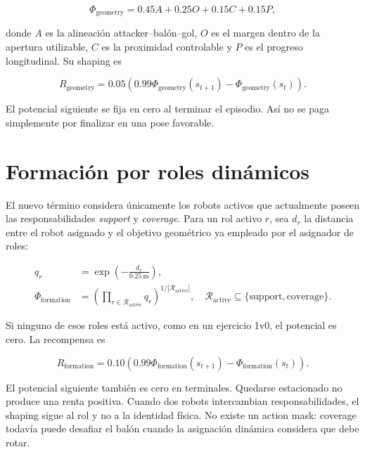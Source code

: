 \documentclass[11pt]{article}
\begin{document}
\begin{equation}
\Phi_{\mathrm{geometry}} =
0.45 A + 0.25 O + 0.15 C + 0.15 P,
\end{equation}

donde $A$ es la alineación attacker--balón--gol, $O$ es el margen dentro de la apertura
utilizable, $C$ es la proximidad controlable y $P$ es el progreso longitudinal. Su shaping es

\begin{equation}
R_{\mathrm{geometry}} = 0.05
\left(0.99\Phi_{\mathrm{geometry}}(s_{t+1})-
\Phi_{\mathrm{geometry}}(s_t)\right).
\end{equation}

El potencial siguiente se fija en cero al terminar el episodio. Así no se paga simplemente por
finalizar en una pose favorable.

\section{Formación por roles dinámicos}

El nuevo término considera únicamente los robots activos que actualmente poseen las
responsabilidades \emph{support} y \emph{coverage}. Para un rol activo $r$, sea $d_r$ la distancia
entre el robot asignado y el objetivo geométrico ya empleado por el asignador de roles:

\begin{align}
q_r &= \exp\!\left(-\frac{d_r}{0.25\ \mathrm{m}}\right),\\
\Phi_{\mathrm{formation}} &=
\left(\prod_{r\in\mathcal{R}_{\mathrm{active}}}q_r\right)^{
1/|\mathcal{R}_{\mathrm{active}}|},
\quad \mathcal{R}_{\mathrm{active}}\subseteq
\{\mathrm{support},\mathrm{coverage}\}.
\end{align}

Si ninguno de esos roles está activo, como en un ejercicio 1v0, el potencial es cero. La
recompensa es

\begin{equation}
R_{\mathrm{formation}} = 0.10
\left(0.99\Phi_{\mathrm{formation}}(s_{t+1})-
\Phi_{\mathrm{formation}}(s_t)\right).
\end{equation}

El potencial siguiente también es cero en terminales. Quedarse estacionado no produce una renta
positiva. Cuando dos robots intercambian responsabilidades, el shaping sigue al rol y no a la
identidad física. No existe un action mask: coverage todavía puede desafiar el balón cuando la
asignación dinámica considera que debe rotar.
\end{document}
